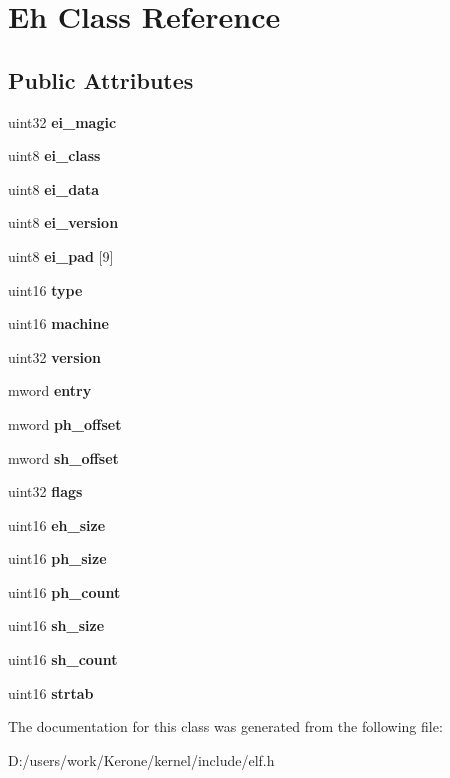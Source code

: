 \section{Eh Class Reference}
\label{class_eh}
\subsection*{Public Attributes}
\begin{DoxyCompactItemize}
\item 
\mbox{\label{class_eh_ade0a9f9e28a2461010b4d08141124f77}} 
uint32 {\bfseries ei\+\_\+magic}
\item 
\mbox{\label{class_eh_a4f6ce3056edfc0d580a7c56086630f9e}} 
uint8 {\bfseries ei\+\_\+class}
\item 
\mbox{\label{class_eh_a5e71320cfd0206d81d761aa9645fe2ec}} 
uint8 {\bfseries ei\+\_\+data}
\item 
\mbox{\label{class_eh_a0a4f59820c929b2842180c8f225f7dea}} 
uint8 {\bfseries ei\+\_\+version}
\item 
\mbox{\label{class_eh_a94cb691640641fe94c9ff7dde33e74c5}} 
uint8 {\bfseries ei\+\_\+pad} [9]
\item 
\mbox{\label{class_eh_a1b0abfabbb8473705686109266c82221}} 
uint16 {\bfseries type}
\item 
\mbox{\label{class_eh_a73f9c3bb0f59835b11ffccb183269585}} 
uint16 {\bfseries machine}
\item 
\mbox{\label{class_eh_aa5c32b48860a1cd66f7a77121f967168}} 
uint32 {\bfseries version}
\item 
\mbox{\label{class_eh_a49fa0c772bff4b956e14e52d82a4938d}} 
mword {\bfseries entry}
\item 
\mbox{\label{class_eh_a96d09ea4afbc3fe8fe857c5824c3ca2d}} 
mword {\bfseries ph\+\_\+offset}
\item 
\mbox{\label{class_eh_a9709bdbb1c14c52f1389212bd964d07c}} 
mword {\bfseries sh\+\_\+offset}
\item 
\mbox{\label{class_eh_ade0141a13dd59db51cb315cd5fdf65a7}} 
uint32 {\bfseries flags}
\item 
\mbox{\label{class_eh_ad04ce7b016ebe6277767f923121cab9b}} 
uint16 {\bfseries eh\+\_\+size}
\item 
\mbox{\label{class_eh_a3896a43e2ad8202ce919e5cda566635c}} 
uint16 {\bfseries ph\+\_\+size}
\item 
\mbox{\label{class_eh_a7576c28290904a293c1c065909f4e174}} 
uint16 {\bfseries ph\+\_\+count}
\item 
\mbox{\label{class_eh_af362c572660e0054878bff7f4573daa2}} 
uint16 {\bfseries sh\+\_\+size}
\item 
\mbox{\label{class_eh_ab3b998a35e7e2850ab3692850410c4b7}} 
uint16 {\bfseries sh\+\_\+count}
\item 
\mbox{\label{class_eh_ad77b1b7efd98965140c962977a91b927}} 
uint16 {\bfseries strtab}
\end{DoxyCompactItemize}


The documentation for this class was generated from the following file\+:\begin{DoxyCompactItemize}
\item 
D\+:/users/work/\+Kerone/kernel/include/elf.\+h\end{DoxyCompactItemize}
